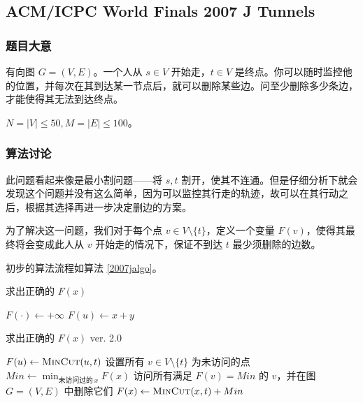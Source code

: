		\newpage
					
	
		\subsection{ACM/ICPC World Finals 2007 J Tunnels}
			\subsubsection{题目大意}
				有向图 $G = (V, E)$。一个人从 $s \in V$ 开始走，$t \in V$ 是终点。你可以随时监控他的位置，并每次在其到达某一节点后，就可以删除某些边。问至少删除多少条边，才能使得其无法到达终点。
				
				$N = |V| \le 50, M = |E| \le 100 $。
			\subsubsection{算法讨论}
				此问题看起来像是最小割问题——将 $s, t$ 割开，使其不连通。但是仔细分析下就会发现这个问题并没有这么简单，因为可以监控其行走的轨迹，故可以在其行动之后，根据其选择再进一步决定删边的方案。
				
				为了解决这一问题，我们对于每个点 $v \in V \setminus \{ t\}$，定义一个变量 $F(v)$，使得其最终将会变成此人从 $v$ 开始走的情况下，保证不到达 $t$ 最少须删除的边数。
				
				初步的算法流程如算法 \ref{2007jalgo}。%
				\begin{algorithm}[H]
				\caption{求出正确的 $F(x)$}
				\label{2007jalgo}
					\begin{algorithmic}[1]
						\State $F(\cdot) \gets + \infty$
						  \label{2007jaaa}
							\State $F(u) \gets x + y$
							\EndIf
						\EndFor
					\end{algorithmic}
				\end{algorithm}
				\begin{algorithm}[tbh]
				\caption{求出正确的 $F(x)$ ver. 2.0}
				\label{2007jalgo2}
					\begin{algorithmic}[1]
							\State $F(u) \gets \Call{MinCut}{u, t}$
						\EndFor
						\State 设置所有 $v \in V \setminus \{ t\}$ 为未访问的点
							\State $Min \gets \min_{\text{未访问过的}\, x}{F(x)}$
							\State 访问所有满足 $F(v) = Min$ 的 $v$，并在图 $G = (V, E)$ 中删除它们 
							 									 
								\State $F(x) \gets \Call{MinCut}{x, t} + Min$
								\EndIf
							\EndFor
						\EndFor
					\end{algorithmic}
				\end{algorithm}
				
